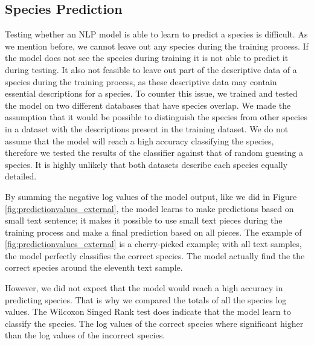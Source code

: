 \documentclass[a4paper, 12pt, oneside]{book} %
\begin{document}





\subsection{Species Prediction}
Testing whether an NLP model is able to learn to predict a species is difficult.
As we mention before, we cannot leave out any species during the training process.
If the model does not see the species during training it is not able to predict it during testing.
It also not feasible to leave out part of the descriptive data of a species during the training process, as these descriptive data may contain essential descriptions for a species.
To counter this issue, we trained and tested the model on two different databases that have species overlap.
We made the assumption that it would be possible to distinguish the species from other species in a dataset with the descriptions present in the training dataset.
We do not assume that the model will reach a high accuracy classifying the species, therefore we tested the results of the classifier against that of random guessing a species.
It is highly unlikely that both datasets describe each species equally detailed.

By summing the negative log values of the model output, like we did in Figure \ref{fig:predictionvalues_external}, the model learns to make predictions based on small text sentence; it makes it possible to use small text pieces during the training process and make a final prediction based on all pieces.
The example of \ref{fig:predictionvalues_external} is a cherry-picked example; with all text samples, the model perfectly classifies the correct species.
The model actually find the the correct species around the eleventh text sample.

However, we did not expect that the model would reach a high accuracy in predicting species.
That is why we compared the totals of all the species log values.
The Wilcoxon Singed Rank test does indicate that the model learn to classify the species.
The log values of the correct species where significant higher than the log values of the incorrect species.
\end{document}
